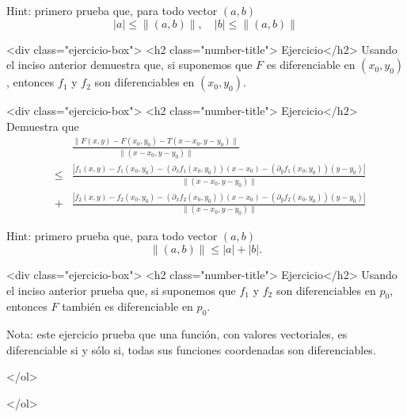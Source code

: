 \documentclass{article}
\theoremstyle{definition}
\begin{document}
            Hint: primero prueba  que, para todo vector $(a,b)$
            $$
            |a|\leq \| (a,b)\|, \quad |b|\leq \|(a,b) \|
            $$
            
          <div class="ejercicio-box"> <h2 class="number-title"> Ejercicio</h2> Usando el inciso anterior demuestra que, si suponemos
            que $F$ es diferenciable en $(x_0,y_0)$, entonces
            $f_1$ y $f_2$ son diferenciables en $(x_0,y_0)$.

          <div class="ejercicio-box"> <h2 class="number-title"> Ejercicio</h2> Demuestra que
            \begin{eqnarray*}
              & & \frac{\|F(x,y)-F(x_0,y_0)-T(x-x_0,y-y_0) \|}{\|(x-x_0,y-y_0)\|} \\
              &\leq &
                      \frac{|f_1(x,y)-f_1(x_0,y_0)-
                      (\partial_xf_1(x_0,y_0))(x-x_0)-
                      (\partial_yf_1(x_0,y_0))(y-y_0)|}
                      {\| (x-x_0,y-y_0)\|} \\
              &+&  \frac{|f_2(x,y)-f_2(x_0,y_0)-
                      (\partial_xf_2(x_0,y_0))(x-x_0)-
                      (\partial_yf_2(x_0,y_0))(y-y_0)|}
                      {\| (x-x_0,y-y_0)\|}
            \end{eqnarray*}

            Hint: primero prueba que, para todo vector $(a,b)$
            $$
            \| (a,b) \| \leq |a| + |b|.
            $$

            <div class="ejercicio-box"> <h2 class="number-title"> Ejercicio</h2> Usando el inciso anterior prueba que, si
          suponemos que $f_1$ y $f_2$ son diferenciables
          en $p_0$, entonces $F$ también es diferenciable
          en $p_0$.


          Nota: este ejercicio prueba que una función,
          con valores vectoriales, es diferenciable si y sólo si,
          todas sus funciones coordenadas son diferenciables.
         
          </ol>

        
</ol>


  
       
\end{document}
